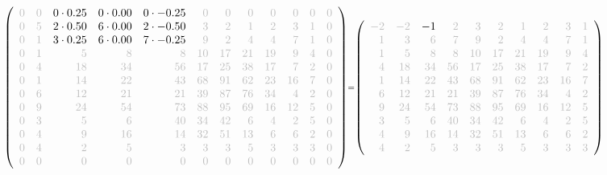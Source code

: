 \documentclass[11pt]{article}
\begin{document}
    
    \[\scriptstyle \def\g{\color{lightgray}}\left(\begin{array}{rrrrrrrrrrrr}\g{0} & \g{0} & 0\cdot 0.25 & 0\cdot 0.00 & 0\cdot -0.25 & \g{0} & \g{0} & \g{0} & \g{0} & \g{0} & \g{0} & \g{0}\\\g{0} & \g{5} & 2\cdot 0.50 & 6\cdot 0.00 & 2\cdot -0.50 & \g{3} & \g{2} & \g{1} & \g{2} & \g{3} & \g{1} & \g{0}\\\g{0} & \g{1} & 3\cdot 0.25 & 6\cdot 0.00 & 7\cdot -0.25 & \g{9} & \g{2} & \g{4} & \g{4} & \g{7} & \g{1} & \g{0}\\\g{0} & \g{1} & \g{5} & \g{8} & \g{8} & \g{10} & \g{17} & \g{21} & \g{19} & \g{9} & \g{4} & \g{0}\\\g{0} & \g{4} & \g{18} & \g{34} & \g{56} & \g{17} & \g{25} & \g{38} & \g{17} & \g{7} & \g{2} & \g{0}\\\g{0} & \g{1} & \g{14} & \g{22} & \g{43} & \g{68} & \g{91} & \g{62} & \g{23} & \g{16} & \g{7} & \g{0}\\\g{0} & \g{6} & \g{12} & \g{21} & \g{21} & \g{39} & \g{87} & \g{76} & \g{34} & \g{4} & \g{2} & \g{0}\\\g{0} & \g{9} & \g{24} & \g{54} & \g{73} & \g{88} & \g{95} & \g{69} & \g{16} & \g{12} & \g{5} & \g{0}\\\g{0} & \g{3} & \g{5} & \g{6} & \g{40} & \g{34} & \g{42} & \g{6} & \g{4} & \g{2} & \g{5} & \g{0}\\\g{0} & \g{4} & \g{9} & \g{16} & \g{14} & \g{32} & \g{51} & \g{13} & \g{6} & \g{6} & \g{2} & \g{0}\\\g{0} & \g{4} & \g{2} & \g{5} & \g{3} & \g{3} & \g{3} & \g{5} & \g{3} & \g{3} & \g{3} & \g{0}\\\g{0} & \g{0} & \g{0} & \g{0} & \g{0} & \g{0} & \g{0} & \g{0} & \g{0} & \g{0} & \g{0} & \g{0}\end{array}\right)=\left(\begin{array}{rrrrrrrrrrrr}\g{-2} & \g{-2} & -1 & \g{2} & \g{3} & \g{2} & \g{1} & \g{2} & \g{3} & \g{1}\\\g{1} & \g{3} & \g{6} & \g{7} & \g{9} & \g{2} & \g{4} & \g{4} & \g{7} & \g{1}\\\g{1} & \g{5} & \g{8} & \g{8} & \g{10} & \g{17} & \g{21} & \g{19} & \g{9} & \g{4}\\\g{4} & \g{18} & \g{34} & \g{56} & \g{17} & \g{25} & \g{38} & \g{17} & \g{7} & \g{2}\\\g{1} & \g{14} & \g{22} & \g{43} & \g{68} & \g{91} & \g{62} & \g{23} & \g{16} & \g{7}\\\g{6} & \g{12} & \g{21} & \g{21} & \g{39} & \g{87} & \g{76} & \g{34} & \g{4} & \g{2}\\\g{9} & \g{24} & \g{54} & \g{73} & \g{88} & \g{95} & \g{69} & \g{16} & \g{12} & \g{5}\\\g{3} & \g{5} & \g{6} & \g{40} & \g{34} & \g{42} & \g{6} & \g{4} & \g{2} & \g{5}\\\g{4} & \g{9} & \g{16} & \g{14} & \g{32} & \g{51} & \g{13} & \g{6} & \g{6} & \g{2}\\\g{4} & \g{2} & \g{5} & \g{3} & \g{3} & \g{3} & \g{5} & \g{3} & \g{3} & \g{3}\end{array}\right)\]
\end{document}
